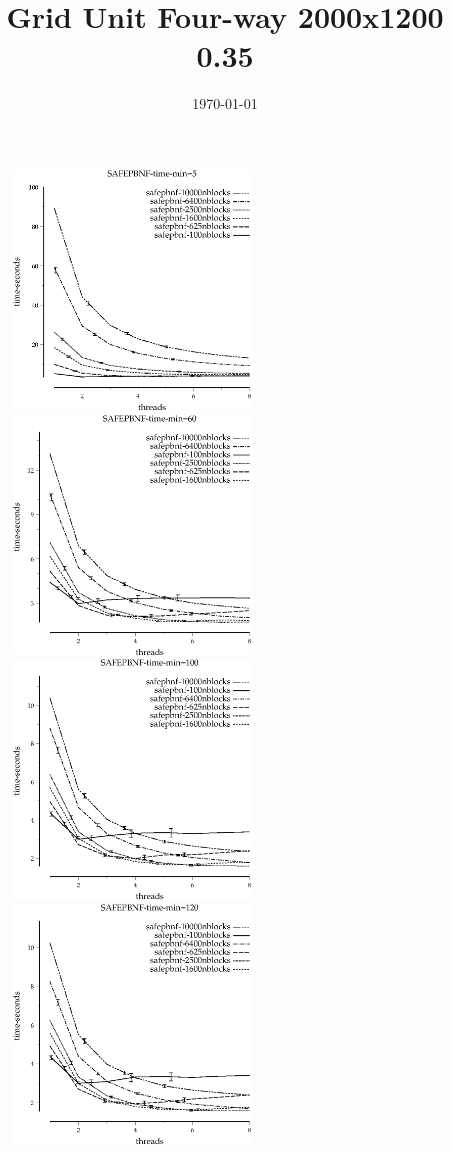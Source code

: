 \documentclass{article}
\title{Grid Unit Four-way 2000x1200 0.35}
\date{\today}
\begin{document}
\maketitle

\begin{figure}
\begin{center}
\includegraphics[width=2.5in]{SAFEPBNF-time-min=5}
\includegraphics[width=2.5in]{SAFEPBNF-time-min=60}
\includegraphics[width=2.5in]{SAFEPBNF-time-min=100}
\includegraphics[width=2.5in]{SAFEPBNF-time-min=120}

\end{center}
\end{figure}
\end{document}
